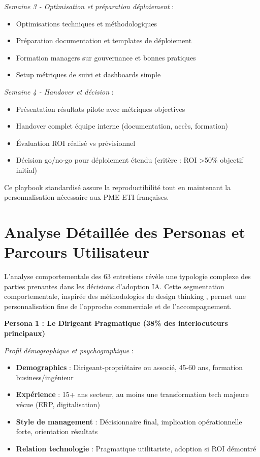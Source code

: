 \textit{Semaine 3 - Optimisation et préparation déploiement} :
\begin{itemize}
    \item Optimisations techniques et méthodologiques
    \item Préparation documentation et templates de déploiement
    \item Formation managers sur gouvernance et bonnes pratiques
    \item Setup métriques de suivi et dashboards simple
\end{itemize}

\textit{Semaine 4 - Handover et décision} :
\begin{itemize}
    \item Présentation résultats pilote avec métriques objectives
    \item Handover complet équipe interne (documentation, accès, formation)
    \item Évaluation ROI réalisé vs prévisionnel
    \item Décision go/no-go pour déploiement étendu (critère : ROI >50\% objectif initial)
\end{itemize}

Ce playbook standardisé assure la reproductibilité tout en maintenant la personnalisation nécessaire aux PME-ETI françaises.

\section{Analyse Détaillée des Personas et Parcours Utilisateur}

L'analyse comportementale des 63 entretiens révèle une typologie complexe des parties prenantes dans les décisions d'adoption IA. Cette segmentation comportementale, inspirée des méthodologies de design thinking \cite{brown2009change}, permet une personnalisation fine de l'approche commerciale et de l'accompagnement.

\textbf{Persona 1 : Le Dirigeant Pragmatique (38\% des interlocuteurs principaux)}

\emph{Profil démographique et psychographique} :
\begin{itemize}
    \item \textbf{Demographics} : Dirigeant-propriétaire ou associé, 45-60 ans, formation business/ingénieur
    \item \textbf{Expérience} : 15+ ans secteur, au moins une transformation tech majeure vécue (ERP, digitalisation)
    \item \textbf{Style de management} : Décisionnaire final, implication opérationnelle forte, orientation résultats
    \item \textbf{Relation technologie} : Pragmatique utilitariste, adoption si ROI démontré
\end{itemize}


